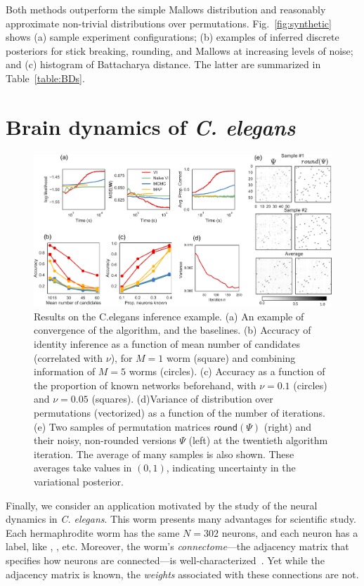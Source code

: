 \documentclass[twoside]{article}
\begin{document}
Both methods outperform the simple Mallows distribution and reasonably
approximate non-trivial distributions over
permutations. Fig.~\ref{fig:synthetic} shows (a) sample experiment
configurations; (b) examples of inferred discrete posteriors for
stick breaking, rounding, and Mallows at increasing levels of noise; and
(c) histogram of Battacharya distance.  The latter are summarized in
Table~\ref{table:BDs}.


\section{Brain dynamics of \textit{C. elegans}}
\label{sec:celegans}

\begin{figure}[ht]
  \centering
  \includegraphics[width=6in]{figure7.pdf} 
  \caption{Results on the C.elegans inference example. (a) An example
    of convergence of the algorithm, and the baselines. (b) Accuracy
    of identity inference as a function of mean number of candidates
    (correlated with $\nu$), for $M=1$ worm (square) and combining
    information of $M=5$ worms (circles). (c) Accuracy as a function
    of the proportion of known networks beforehand, with $\nu=0.1$
    (circles) and $\nu=0.05$ (squares). (d)Variance of distribution
    over permutations (vectorized) as a function of the number of
    iterations. (e) Two samples of permutation matrices
    $\mathsf{round}(\Psi)$ (right) and their noisy, non-rounded
    versions $\Psi$ (left) at the twentieth algorithm iteration. The
    average of many samples is also shown. These averages take values in $(0,1)$, 
    indicating uncertainty in the variational posterior.}
\label{fig:elegantresults}
\end{figure}


Finally, we consider an application motivated by the study of the
neural dynamics in \textit{C. elegans}. This worm presents many
advantages for scientific study. Each hermaphrodite worm has the same
${N=302}$ neurons, and each neuron has a label, like ,
, etc.  Moreover, the worm's \emph{connectome}---the
adjacency matrix that specifies how neurons are connected---is
well-characterized~\citep{white1986structure, varshney2011structural}.
Yet while the adjacency matrix is known, the \emph{weights} associated
with these connections are not.
\end{document}
